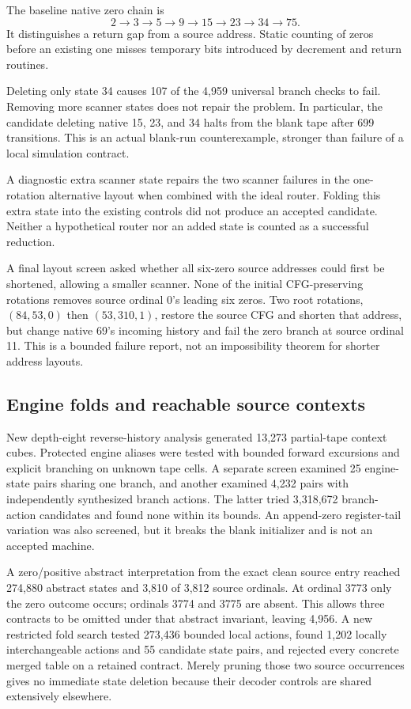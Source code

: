 \documentclass[11pt,a4paper]{article}
\begin{document}
The baseline native zero chain is
\[
2\to3\to5\to9\to15\to23\to34\to75.
\]
It distinguishes a return gap from a source address. Static counting of zeros before an existing one misses temporary bits introduced by decrement and return routines.

Deleting only state 34 causes 107 of the 4,959 universal branch checks to fail. Removing more scanner states does not repair the problem. In particular, the candidate deleting native 15, 23, and 34 halts from the blank tape after 699 transitions. This is an actual blank-run counterexample, stronger than failure of a local simulation contract.

A diagnostic extra scanner state repairs the two scanner failures in the one-rotation alternative layout when combined with the ideal router. Folding this extra state into the existing controls did not produce an accepted candidate. Neither a hypothetical router nor an added state is counted as a successful reduction.

A final layout screen asked whether all six-zero source addresses could first be shortened, allowing a smaller scanner. None of the initial CFG-preserving rotations removes source ordinal 0's leading six zeros. Two root rotations, $(84,53,0)$ then $(53,310,1)$, restore the source CFG and shorten that address, but change native 69's incoming history and fail the zero branch at source ordinal 11. This is a bounded failure report, not an impossibility theorem for shorter address layouts.

\subsection{Engine folds and reachable source contexts}

New depth-eight reverse-history analysis generated 13,273 partial-tape context cubes. Protected engine aliases were tested with bounded forward excursions and explicit branching on unknown tape cells. A separate screen examined 25 engine-state pairs sharing one branch, and another examined 4,232 pairs with independently synthesized branch actions. The latter tried 3,318,672 branch-action candidates and found none within its bounds. An append-zero register-tail variation was also screened, but it breaks the blank initializer and is not an accepted machine.

A zero/positive abstract interpretation from the exact clean source entry reached 274,880 abstract states and 3,810 of 3,812 source ordinals. At ordinal 3773 only the zero outcome occurs; ordinals 3774 and 3775 are absent. This allows three contracts to be omitted under that abstract invariant, leaving 4,956. A new restricted fold search tested 273,436 bounded local actions, found 1,202 locally interchangeable actions and 55 candidate state pairs, and rejected every concrete merged table on a retained contract. Merely pruning those two source occurrences gives no immediate state deletion because their decoder controls are shared extensively elsewhere.
\end{document}
